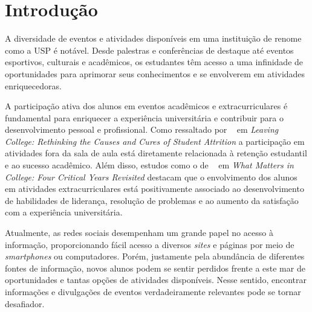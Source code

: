 

\chapter{Introdução}
\label{cap:introducao}

\enlargethispage{.5\baselineskip}

A diversidade de eventos e atividades disponíveis em uma instituição de renome
como a \ac{USP} é notável. Desde palestras e conferências de destaque até
eventos esportivos, culturais e acadêmicos, os estudantes têm acesso a uma
infinidade de oportunidades para aprimorar seus conhecimentos e se envolverem
em atividades enriquecedoras.

A participação ativa dos alunos em eventos acadêmicos e extracurriculares é
fundamental para enriquecer a experiência universitária e contribuir para o
desenvolvimento pessoal e profissional. Como ressaltado por ~\citet{tinto:12}
em \emph{Leaving College: Rethinking the Causes and Cures of Student Attrition}
a participação em atividades fora da sala de aula está diretamente relacionada
à retenção estudantil e ao sucesso acadêmico. Além disso, estudos como o de
~\citet{astin:97} em \emph{What Matters in College: Four Critical Years
    Revisited} destacam que o envolvimento dos alunos em atividades
extracurriculares está positivamente associado ao desenvolvimento de
habilidades de liderança, resolução de problemas e ao aumento da satisfação com
a experiência universitária.

Atualmente, as redes sociais desempenham um grande papel no acesso à
informação, proporcionando fácil acesso a diversos \textit{sites} e páginas por
meio de \textit{smartphones} ou computadores. Porém, justamente pela abundância
de diferentes fontes de informação, novos alunos podem se sentir perdidos
frente a este mar de oportunidades e tantas opções de atividades disponíveis.
Nesse sentido, encontrar informações e divulgações de eventos verdadeiramente
relevantes pode se tornar desafiador.


